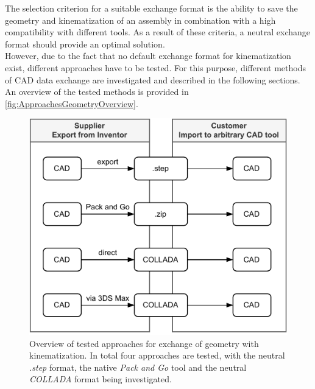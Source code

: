     The selection criterion for a suitable exchange format is the ability to save the geometry and kinematization of an assembly in combination with a high compatibility with different tools. As a result of these criteria, a neutral exchange format should provide an optimal solution.  \\
    However, due to the fact that no default exchange format for kinematization exist, different approaches have to be tested. For this purpose, different methods of CAD data exchange are investigated and described in the following sections. An overview of the tested methods is provided in \autoref{fig:ApproachesGeometryOverview}.\\
	\begin{figure}[ht]
		\centering
		\includegraphics{figures/MethodsOverviewCAD.pdf}
		\caption[Overview of approaches for exchange of geometry with kinematization.] {Overview of tested approaches for exchange of geometry with kinematization. In total four approaches are tested, with the neutral \textit{.step} format, the native \textit{Pack and Go} tool and the neutral \textit{COLLADA} format being investigated. }
		\label{fig:ApproachesGeometryOverview}
	\end{figure}

    
    
